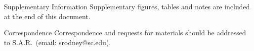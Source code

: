 \documentclass{nature_arxiv}
\begin{document}
\maketitle

\vspace{10pt}

\vspace{10pt}

\makeaffil









\clearpage
\begin{methods}
 
 
 
 
 
 
 
 
 
 
 
\end{methods}



{}


\begin{addendum}
 \item[Supplementary Information] Supplementary figures, tables and notes are included at the end of this document.
 \item 
 \item[Correspondence] Correspondence and requests for materials
should be addressed to S.A.R.~(email: srodney@sc.edu).
\end{addendum}


\clearpage
\begin{supplementary}

\end{supplementary}
\end{document}
